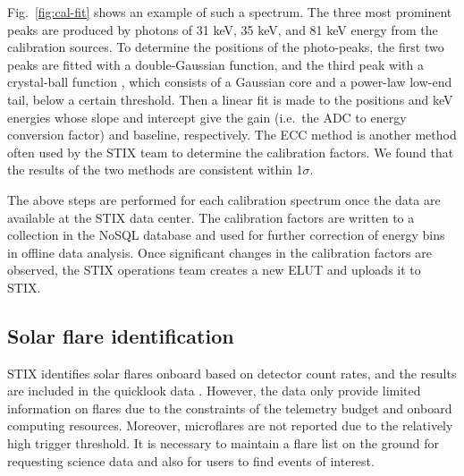 \documentclass[referee]{preaa} %
\begin{document}
Fig.~\ref{fig:cal-fit} shows an example of such a spectrum.  The three most prominent peaks are produced by photons of 31 keV, 35 keV, and 81 keV energy from the calibration sources. To determine the positions of the photo-peaks, the first two peaks are fitted with a double-Gaussian function, and the third peak with a crystal-ball function \citep{crsystallball},
which consists of a Gaussian core 
and a power-law low-end tail, below a certain threshold.
Then a linear fit is made to the positions and keV energies whose slope and intercept give the gain (i.e.\ the ADC to energy conversion factor) and baseline, respectively.
The ECC method \cite[see ][]{ecc,ecc2} is another method often used by the STIX team to determine the calibration factors.  We found that the results of the two methods are consistent within 1$\sigma$.

The above steps are performed for each calibration spectrum once the data are available at the STIX data center. 
The calibration factors are written to a collection in the NoSQL database and used for further correction of energy bins in offline data analysis.   
Once significant changes in the calibration factors are observed, the STIX operations team creates a new ELUT and uploads it to STIX.

\subsection{Solar flare identification}
STIX identifies solar flares onboard based on detector count rates, and the results are included in the quicklook data \citep{stix2020}.  However, the data only provide limited information on flares due to the constraints of the telemetry budget and onboard computing resources.  Moreover, microflares are not reported due to the relatively high trigger threshold.
It is necessary to maintain a flare list on the ground for requesting science data and also for users to find events of interest. 
\end{document}
